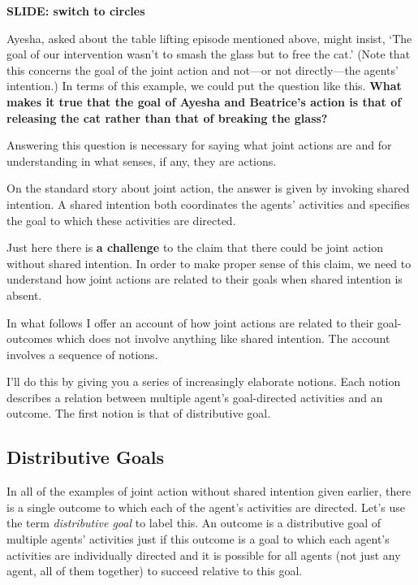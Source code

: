 \documentclass[14pt,a4paper]{extarticle}
\begin{document}
\textbf{SLIDE: switch to circles}

Ayesha, asked about the table lifting episode mentioned above, might insist, `The goal of our intervention wasn't to smash the glass but to free the cat.'  (Note that this concerns the goal of the joint action and not---or not directly---the agents' intention.)  In terms of this example, we could put the question like this.  \textbf{What makes it true that the goal of Ayesha and Beatrice's action is that of releasing the cat rather than that of breaking the glass?}

Answering this question is necessary for saying what joint actions are and for understanding in what senses, if any, they are actions.

On the standard story about joint action, the answer is given by invoking shared intention.
A shared intention both coordinates the agents' activities and specifies the goal to which these activities are directed.

Just here there is \textbf{a challenge} to the claim that there could be joint action without shared intention.
In order to make proper sense of this claim, we need to understand how joint actions are related to their goals when shared intention is absent.

In what follows I offer an account of how joint actions are related to their goal-outcomes which does not involve anything like shared intention.  
The account involves a sequence of notions.











I'll do this by giving you a series of increasingly elaborate notions.  
Each notion describes a relation between multiple agent's goal-directed activities and an outcome.
The first notion is that of distributive goal.


\subsection{Distributive Goals}
In all of the examples of joint action without shared intention given earlier, there is a single outcome to which each of the agent's activities are directed.
Let's use the term \emph{distributive goal} to label this.
An outcome is a distributive goal of multiple agents' activities just if this outcome is a goal to which each agent's activities are individually directed and it is possible for all agents (not just any agent, all of them together) to succeed relative to this goal.
\end{document}
